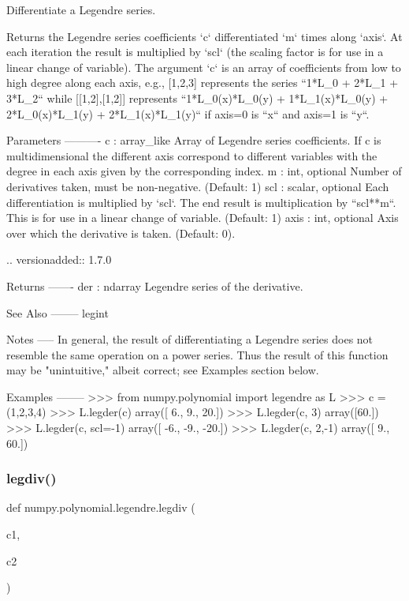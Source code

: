 \begin{DoxyVerb}Differentiate a Legendre series.

Returns the Legendre series coefficients `c` differentiated `m` times
along `axis`.  At each iteration the result is multiplied by `scl` (the
scaling factor is for use in a linear change of variable). The argument
`c` is an array of coefficients from low to high degree along each
axis, e.g., [1,2,3] represents the series ``1*L_0 + 2*L_1 + 3*L_2``
while [[1,2],[1,2]] represents ``1*L_0(x)*L_0(y) + 1*L_1(x)*L_0(y) +
2*L_0(x)*L_1(y) + 2*L_1(x)*L_1(y)`` if axis=0 is ``x`` and axis=1 is
``y``.

Parameters
----------
c : array_like
    Array of Legendre series coefficients. If c is multidimensional the
    different axis correspond to different variables with the degree in
    each axis given by the corresponding index.
m : int, optional
    Number of derivatives taken, must be non-negative. (Default: 1)
scl : scalar, optional
    Each differentiation is multiplied by `scl`.  The end result is
    multiplication by ``scl**m``.  This is for use in a linear change of
    variable. (Default: 1)
axis : int, optional
    Axis over which the derivative is taken. (Default: 0).

    .. versionadded:: 1.7.0

Returns
-------
der : ndarray
    Legendre series of the derivative.

See Also
--------
legint

Notes
-----
In general, the result of differentiating a Legendre series does not
resemble the same operation on a power series. Thus the result of this
function may be "unintuitive," albeit correct; see Examples section
below.

Examples
--------
>>> from numpy.polynomial import legendre as L
>>> c = (1,2,3,4)
>>> L.legder(c)
array([  6.,   9.,  20.])
>>> L.legder(c, 3)
array([60.])
>>> L.legder(c, scl=-1)
array([ -6.,  -9., -20.])
>>> L.legder(c, 2,-1)
array([  9.,  60.])\end{DoxyVerb}
 \mbox{\label{namespacenumpy_1_1polynomial_1_1legendre_a7ceace6a332caef0058cd77820c06773}} 
\subsubsection{\texorpdfstring{legdiv()}{legdiv()}}
{\footnotesize\ttfamily def numpy.\+polynomial.\+legendre.\+legdiv (\begin{DoxyParamCaption}\item[{}]{c1,  }\item[{}]{c2 }\end{DoxyParamCaption})}


